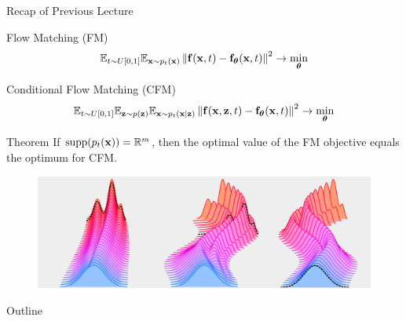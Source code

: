 \documentclass{beamer}
\begin{document}
\begin{frame}{Recap of Previous Lecture}
	\begin{block}{Flow Matching (FM)}
		\vspace{-0.5cm}
		\[
			\mathbb{E}_{t \sim U[0, 1]} \mathbb{E}_{\mathbf{x} \sim p_t(\mathbf{x})}\left\| \mathbf{f}(\mathbf{x}, t) - \mathbf{f}_{\boldsymbol{\theta}}(\mathbf{x}, t) \right\|^2 \rightarrow \min_{\boldsymbol{\theta}}
		\]
		\vspace{-0.5cm}
	\end{block}
	\begin{block}{Conditional Flow Matching (CFM)}
		\vspace{-0.5cm}
		\[
			\mathbb{E}_{t \sim U[0, 1]} \mathbb{E}_{\mathbf{z} \sim p(\mathbf{z})} \mathbb{E}_{\mathbf{x} \sim p_t(\mathbf{x} | \mathbf{z})}\left\| \mathbf{f}(\mathbf{x}, \mathbf{z}, t) - \mathbf{f}_{\boldsymbol{\theta}}(\mathbf{x}, t) \right\|^2 \rightarrow \min_{\boldsymbol{\theta}}
		\]
		\vspace{-0.7cm}
	\end{block}
	\begin{block}{Theorem}
		If $\text{supp}(p_t(\mathbf{x})) = \mathbb{R}^m$, then the optimal value of the FM objective equals the optimum for CFM.
	\end{block}
	\vspace{-0.3cm}
	\begin{figure}
		\centering
		\includegraphics[width=0.8\linewidth]{figs/multiple_dynamics}
	\end{figure}
\end{frame}
\begin{frame}{Outline}
	\tableofcontents
\end{frame}
\end{document}
